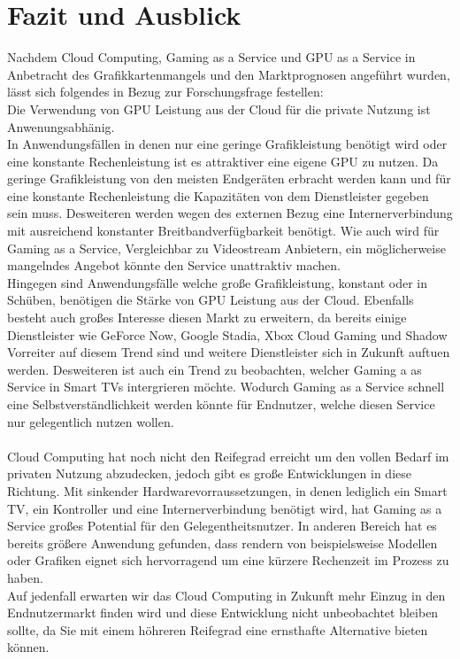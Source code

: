 \documentclass[12pt,toc=bib,toc=listof]{scrreprt}
\begin{document}
\chapter{Fazit und Ausblick} %
\label{sec:fazit}
Nachdem Cloud Computing, Gaming as a Service und GPU as a Service in Anbetracht des Grafikkartenmangels und 
den Marktprognosen angeführt wurden, lässt sich folgendes in Bezug zur Forschungsfrage festellen:\\
Die Verwendung von GPU Leistung aus der Cloud für die private Nutzung ist Anwenungsabhänig.\\
In Anwendungsfällen in denen nur eine geringe Grafikleistung benötigt wird oder eine konstante Rechenleistung ist 
es attraktiver eine eigene GPU zu nutzen. Da geringe Grafikleistung von den meisten Endgeräten erbracht werden kann und 
für eine konstante Rechenleistung die Kapazitäten von dem Dienstleister gegeben sein muss. Desweiteren werden wegen des 
externen Bezug eine Internerverbindung mit ausreichend konstanter Breitbandverfügbarkeit benötigt. 
Wie auch wird für Gaming as a Service, Vergleichbar zu Videostream Anbietern, ein möglicherweise 
mangelndes Angebot könnte den Service unattraktiv machen.\\
Hingegen sind Anwendungsfälle welche große Grafikleistung, konstant oder in Schüben, benötigen die Stärke von GPU Leistung aus der Cloud.
Ebenfalls besteht auch großes Interesse diesen Markt zu erweitern, da bereits 
einige Dienstleister wie GeForce Now, Google Stadia, Xbox Cloud Gaming und Shadow Vorreiter auf diesem Trend sind und 
weitere Dienstleister sich in Zukunft auftuen werden.
Desweiteren ist auch ein Trend zu beobachten, welcher Gaming a as Service in Smart TVs intergrieren möchte. Wodurch 
Gaming as a Service schnell eine Selbstverständlichkeit werden könnte für Endnutzer, welche diesen Service nur gelegentlich nutzen wollen.\\
\\Cloud Computing hat noch nicht den Reifegrad erreicht um den vollen Bedarf im privaten Nutzung abzudecken, jedoch gibt es 
große Entwicklungen in diese Richtung. Mit sinkender Hardwarevorraussetzungen, 
in denen lediglich ein Smart TV, ein Kontroller und eine Internerverbindung benötigt wird, hat Gaming as a Service großes Potential für den Gelegentheitsnutzer.
In anderen Bereich hat es bereits größere Anwendung gefunden, dass rendern von beispielsweise Modellen oder Grafiken eignet sich hervorragend um eine kürzere Rechenzeit im Prozess zu haben.
\\Auf jedenfall erwarten wir das Cloud Computing in Zukunft mehr Einzug in den Endnutzermarkt finden wird und diese Entwicklung nicht unbeobachtet bleiben sollte, da Sie mit einem höhreren Reifegrad eine ernsthafte Alternative bieten können.
\end{document}
